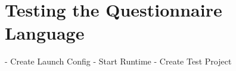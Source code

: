 \section{Testing the Questionnaire Language}

- Create Launch Config
- Start Runtime
- Create Test Project
 
